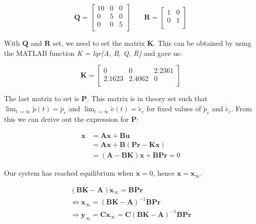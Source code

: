 \begin{equation}
    \label{eq:Q}
  \bm{Q} =
  \begin{bmatrix}
    10 & 0 & 0 \\
    0  & 5 & 0 \\
    0  & 0 & 5 \\
  \end{bmatrix}
  \qquad
  \bm{R} =
  \begin{bmatrix}
    1 & 0 \\
    0 & 1 \\
  \end{bmatrix}
\end{equation}
\newline

With $\bm{Q}$ and $\bm{R}$ set, we need to set the matrix $\bm{K}$. This can be obtained by using the MATLAB function \textit{K = lqr(A, B, Q, R)} and gave us:

\begin{equation}
    \bm{K} = 
    \begin{bmatrix}
     0  & 0 & 2.2361 \\
    2.1623  & 2.4062   & 0 \\
    \end{bmatrix}
\end{equation}
\newline

The last matrix to set is $\bm{P}$. This matrix is in theory set such that $\lim_{t\rightarrow \infty}\tilde{p}(t) = \tilde{p}_c$ and $\lim_{t\rightarrow \infty}\dot{\tilde{e}}(t) = \dot{\tilde{e}}_c$ for fixed values of $\tilde{p}_c$ and $\dot{\tilde{e}}_c$. From this we can derive out the expression for $\bm{P}$:

\begin{align*}
  \dot{\boldsymbol{x}} &= \boldsymbol{Ax} + \boldsymbol{Bu} \\
                       &= \boldsymbol{Ax} +
                         \boldsymbol{B}(\boldsymbol{Pr} -
                         \boldsymbol{Kx}) \\
                       &= (\boldsymbol{A}-\boldsymbol{BK})\boldsymbol{x}
                         + \boldsymbol{BPr} = 0
\end{align*}

Our system has reached equilibrium when $\bm{\dot{x}} = 0$, hence $\bm{x = x_\infty}$.

\begin{align*}
  (\boldsymbol{BK} - \boldsymbol{A})\boldsymbol{x_\infty} = \boldsymbol{BPr} \\
  \Leftrightarrow \boldsymbol{x_\infty} = (\boldsymbol{BK} - \boldsymbol{A})^{-1}\boldsymbol{BPr} \\
  \Rightarrow \boldsymbol{y_\infty} = \boldsymbol{Cx_\infty} = \boldsymbol{C}(\boldsymbol{BK} - \boldsymbol{A})^{-1}\boldsymbol{BPr}
\end{align*}

